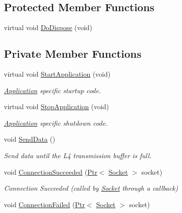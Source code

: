 \subsection*{Protected Member Functions}
\begin{DoxyCompactItemize}
\item 
virtual void \hyperlink{classns3_1_1BulkSendApplication_a9a9a02d7f92d686e9db82f0ef950a9ff}{Do\+Dispose} (void)
\end{DoxyCompactItemize}
\subsection*{Private Member Functions}
\begin{DoxyCompactItemize}
\item 
virtual void \hyperlink{classns3_1_1BulkSendApplication_aa3537015cd452ab46e5c80dc36caf865}{Start\+Application} (void)
\begin{DoxyCompactList}\small\item\em \hyperlink{classns3_1_1Application}{Application} specific startup code. \end{DoxyCompactList}\item 
virtual void \hyperlink{classns3_1_1BulkSendApplication_aa7df541c84adbab61066bd9f6ea27acf}{Stop\+Application} (void)
\begin{DoxyCompactList}\small\item\em \hyperlink{classns3_1_1Application}{Application} specific shutdown code. \end{DoxyCompactList}\item 
void \hyperlink{classns3_1_1BulkSendApplication_afada5c9e192f74cce5eb7f99595d60da}{Send\+Data} ()
\begin{DoxyCompactList}\small\item\em Send data until the L4 transmission buffer is full. \end{DoxyCompactList}\item 
void \hyperlink{classns3_1_1BulkSendApplication_a64f1bc4e311961311589e77f8309755a}{Connection\+Succeeded} (\hyperlink{classns3_1_1Ptr}{Ptr}$<$ \hyperlink{classns3_1_1Socket}{Socket} $>$ socket)
\begin{DoxyCompactList}\small\item\em Connection Succeeded (called by \hyperlink{classns3_1_1Socket}{Socket} through a callback) \end{DoxyCompactList}\item 
void \hyperlink{classns3_1_1BulkSendApplication_aa66a56e8cc81609a0f8c58e41dba6aac}{Connection\+Failed} (\hyperlink{classns3_1_1Ptr}{Ptr}$<$ \hyperlink{classns3_1_1Socket}{Socket} $>$ socket)

\end{DoxyCompactItemize}
